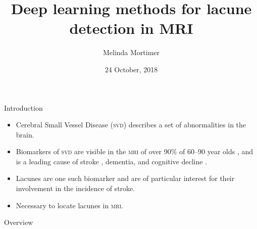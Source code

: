 \documentclass{beamer}
\title{Deep learning methods for lacune detection in MRI}
\author{Melinda Mortimer}
\institute[UNSW] %
{
  Supervisors: Dr Pierre Lafaye de Micheaux and A/Prof. Wei Wen
}
\date{24 October, 2018}
\begin{document}
\begin{frame}
	\titlepage
\end{frame}


\begin{frame}{Introduction}
    \begin{itemize}
    \item Cerebral Small Vessel Disease (\textsc{svd}) describes a set of abnormalities in the brain.
    \item Biomarkers of \textsc{svd} are visible in the \textsc{mri} of over 90\% of 60--90 year olds \citep{deLeeuwF-E2001Pocw}, and is a leading cause of stroke \citep{WardlawJ.M.2013Nsfr}, dementia, and cognitive decline \citep{NorrvingBo2008Linb}.
    \item Lacunes are one such biomarker and are of particular interest for their involvement in the incidence of stroke.
    \item Necessary to locate lacunes in \textsc{mri}.
    \end{itemize}
\end{frame}


\begin{frame}{Overview}
	\tableofcontents
\end{frame}


\end{document}
